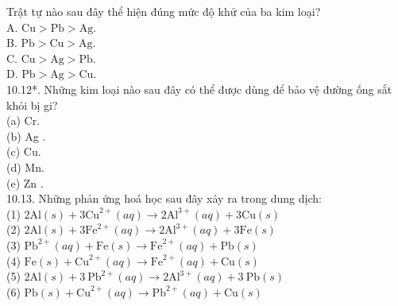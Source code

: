 \documentclass[10pt]{article}
\begin{document}
Trật tự nào sau đây thể hiện đúng mức độ khử của ba kim loại?\\
A. $\mathrm{Cu}>\mathrm{Pb}>\mathrm{Ag}$.\\
B. $\mathrm{Pb}>\mathrm{Cu}>\mathrm{Ag}$.\\
C. $\mathrm{Cu}>\mathrm{Ag}>\mathrm{Pb}$.\\
D. $\mathrm{Pb}>\mathrm{Ag}>\mathrm{Cu}$.\\
10.12*. Những kim loại nào sau đây có thể được dùng để bảo vệ đường ống sắt khỏi bị gi?\\
(a) Cr.\\
(b) Ag .\\
(c) Cu.\\
(d) Mn.\\
(e) Zn .\\
10.13. Những phản ứng hoá học sau đây xảy ra trong dung dịch:\\
(1) $2 \mathrm{Al}(s)+3 \mathrm{Cu}^{2+}(a q) \rightarrow 2 \mathrm{Al}^{3+}(a q)+3 \mathrm{Cu}(s)$\\
(2) $2 \mathrm{Al}(s)+3 \mathrm{Fe}^{2+}(a q) \rightarrow 2 \mathrm{Al}^{3+}(a q)+3 \mathrm{Fe}(s)$\\
(3) $\mathrm{Pb}^{2+}(a q)+\mathrm{Fe}(s) \rightarrow \mathrm{Fe}^{2+}(a q)+\mathrm{Pb}(s)$\\
(4) $\mathrm{Fe}(s)+\mathrm{Cu}^{2+}(a q) \rightarrow \mathrm{Fe}^{2+}(a q)+\mathrm{Cu}(s)$\\
(5) $2 \mathrm{Al}(s)+3 \mathrm{~Pb}^{2+}(a q) \rightarrow 2 \mathrm{Al}^{3+}(a q)+3 \mathrm{~Pb}(s)$\\
(6) $\mathrm{Pb}(s)+\mathrm{Cu}^{2+}(a q) \rightarrow \mathrm{Pb}^{2+}(a q)+\mathrm{Cu}(s)$
\end{document}
